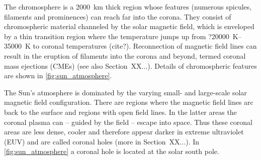 The chromosphere is a \SI{2000}{\km} thick region whose features (numerous spicules, filaments and prominences) can reach far into the corona. They consist of chromospheric material channeled by the solar magnetic field, which is enveloped by a thin transition region where the temperature jumps up from ?\SIrange{20000}{35000}{\K} to coronal temperatures (cite?). Reconnection of magnetic field lines can result in the eruption of filaments into the corona and beyond, termed coronal mass ejections (CMEs) (see also Section~XX...). Details of chromospheric features are shown in \autoref{fig:sun_atmosphere}.

The Sun's atmosphere is dominated by the varying small- and large-scale solar magnetic field configuration. There are regions where the magnetic field lines arc back to the surface and regions with open field lines. In the latter areas the coronal plasma can -- guided by the field -- escape into space. Thus these coronal areas are less dense, cooler and therefore appear darker in extreme ultraviolet (EUV) and are called coronal holes (more in Section~XX...). In \autoref{fig:sun_atmosphere} a coronal hole is located at the solar south pole.
\begin{figure}[htb]
\end{figure}

